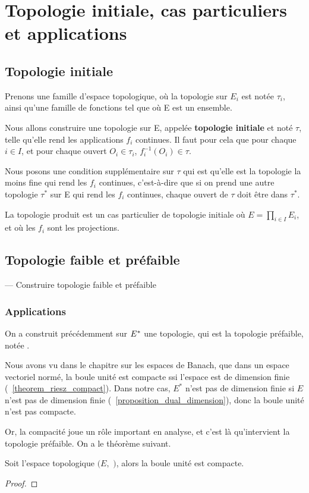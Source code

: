 \chapter{Topologie initiale, cas particuliers et applications}

\section{Topologie initiale}

Prenons une famille
 d'espace topologique, où la topologie sur $E_{i}$ est notée
$\tau_{i}$, ainsi qu'une famille de fonctions  tel que
 où E est un ensemble.

Nous allons construire une topologie sur E, appelée \textbf{topologie initiale}
et noté $\tau$, telle qu'elle rend les applications $f_{i}$ continues. Il faut
pour cela que pour chaque $i \in I$, et pour chaque ouvert $O_{i} \in \tau_{i}$,
$f_{i}^{-1}(O_{i}) \in \tau$.

Nous posons une condition supplémentaire sur $\tau$ qui est qu'elle est la
topologie la moins fine qui rend les $f_{i}$ continues, c'est-à-dire que si on
prend une autre topologie $\tau^{*}$ sur E qui rend les $f_{i}$ continues, chaque
ouvert de $\tau$ doit être dans $\tau^{*}$.

\begin{exemple}
	La topologie produit est un cas particulier de topologie initiale où $E =
	\displaystyle \prod_{i \in I} E_{i}$, et où les $f_{i}$ sont les projections.
\end{exemple}

\section{Topologie faible et préfaible}

--- Construire topologie faible et préfaible
\subsection{Applications}

On a construit précédemment sur $E^{*}$ une topologie, qui est la topologie
préfaible, notée .

Nous avons vu dans le chapitre sur les espaces de Banach, que dans un espace
vectoriel normé, la boule unité est compacte ssi l'espace est de dimension
finie (~\ref{theorem_riesz_compact}). Dans notre cas, $E^{*}$ n'est pas de
dimension finie si $E$ n'est pas de dimension finie
(~\ref{proposition_dual_dimension}), donc la boule unité n'est pas compacte.

Or, la compacité joue un rôle important en analyse, et c'est là qu'intervient la
topologie préfaible. On a le théorème suivant.

\begin{theorem}
	Soit l'espace topologique $(E,$ $)$, alors la boule unité
	est compacte.
\end{theorem}

\begin{proof}
	
\end{proof}
